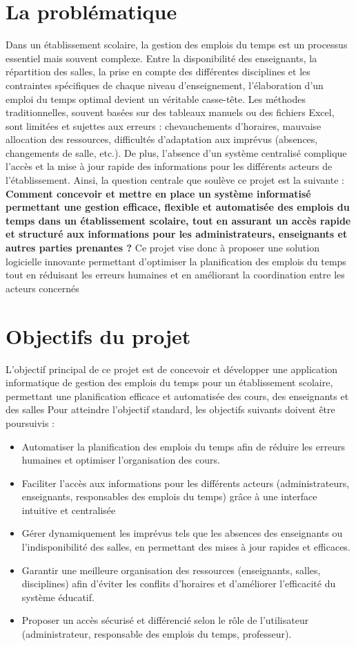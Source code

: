 \documentclass[english,12pt,a4paper]{report}
\begin{document}
\section{La problématique}
Dans un établissement scolaire, la gestion des emplois du temps est un processus essentiel mais souvent complexe. Entre la disponibilité des enseignants, la répartition des salles, la prise en compte des différentes disciplines et les contraintes spécifiques de chaque niveau d’enseignement, l’élaboration d’un emploi du temps optimal devient un véritable casse-tête. Les méthodes traditionnelles, souvent basées sur des tableaux manuels ou des fichiers Excel, sont limitées et sujettes aux erreurs : chevauchements d’horaires, mauvaise allocation des ressources, difficultés d’adaptation aux imprévus (absences, changements de salle, etc.). De plus, l’absence d’un système centralisé complique l’accès et la mise à jour rapide des informations pour les différents acteurs de l’établissement. Ainsi, la question centrale que soulève ce projet est la suivante :
\textbf{Comment concevoir et mettre en place un système informatisé permettant une gestion efficace, flexible et automatisée des emplois du temps dans un établissement scolaire, tout en assurant un accès rapide et structuré aux informations pour les administrateurs, enseignants et autres parties prenantes ?} Ce projet vise donc à proposer une solution logicielle innovante permettant d’optimiser la planification des emplois du temps tout en réduisant les erreurs humaines et en améliorant la coordination entre les acteurs concernés

\section{Objectifs du projet }
 L’objectif principal de ce projet est de concevoir et développer une application informatique de gestion des emplois du temps pour un établissement scolaire, permettant une planification efficace et automatisée des cours, des enseignants et des salles
 Pour atteindre l'objectif standard, les objectifs suivants doivent être poursuivis : 
\begin{itemize}
	\item Automatiser la planification des emplois du temps afin de réduire les erreurs humaines et optimiser l’organisation des cours.
	\item Faciliter l’accès aux informations pour les différents acteurs (administrateurs, enseignants, responsables des emplois du temps) grâce à une interface intuitive et centralisée
	\item Gérer dynamiquement les imprévus tels que les absences des enseignants ou l’indisponibilité des salles, en permettant des mises à jour rapides et efficaces.
	\item Garantir une meilleure organisation des ressources (enseignants, salles, disciplines) afin d’éviter les conflits d’horaires et d’améliorer l’efficacité du système éducatif.
	\item Proposer un accès sécurisé et différencié selon le rôle de l’utilisateur (administrateur, responsable des emplois du temps, professeur).
\end{itemize}
\end{document}
